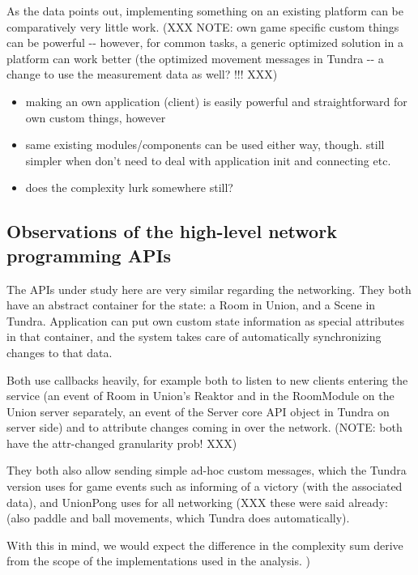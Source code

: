 \documentclass[conference]{IEEEtran}
\begin{document}
As the data points out, implementing something on an existing platform
can be comparatively very little work. (XXX NOTE: own game specific
custom things can be powerful -{}- however, for common tasks, a generic
optimized solution in a platform can work better (the optimized
movement messages in Tundra -{}- a change to use the measurement data as
well? !!! XXX)
%
\begin{itemize}

\item making an own application (client) is easily powerful and
straightforward for own custom things, however

\item same existing modules/components can be used either way,
though. still simpler when don't need to deal with application init
and connecting etc.

\item does the complexity lurk somewhere still?

\end{itemize}


\subsection{Observations of the high-level network programming APIs%
  \label{observations-of-the-high-level-network-programming-apis}%
}

The APIs under study here are very similar regarding the
networking. They both have an abstract container for the state: a Room
in Union, and a Scene in Tundra. Application can put own custom state
information as special attributes in that container, and the system
takes care of automatically synchronizing changes to that data.

Both use callbacks heavily, for example both to listen to new clients
entering the service (an event of Room in Union's Reaktor and in the
RoomModule on the Union server separately, an event of the Server core
API object in Tundra on server side) and to attribute changes coming
in over the network. (NOTE: both have the attr-changed granularity prob! XXX)

They both also allow sending simple ad-hoc custom messages, which the
Tundra version uses for game events such as informing of a victory
(with the associated data), and UnionPong uses for all networking
(XXX these were said already:
(also paddle and ball movements, which Tundra does automatically).

With this in mind, we would expect the difference in the complexity
sum derive from the scope of the implementations used in the analysis.
)
\end{document}
